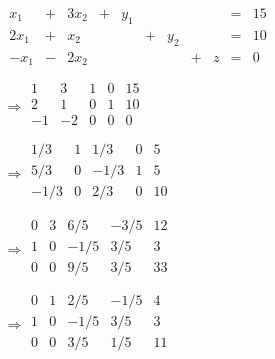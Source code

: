 \documentclass[dvipdfmx,titlepage, a4paper]{jsarticle}%
\begin{document}
\begin{eqnarray*}
	\begin{array}{ccccccccccc}
		x_{1} & + & 3x_{2} & + & y_{1} & \;& \; &\; & \; & = & 15\\
		2x_{1} & + & x_{2} & \; &\; & + & y_{2} &\; & \; & = & 10\\
		-x_{1} & - & 2x_{2} & \; &\; & \;& \; & + & z & = & 0\\
	\end{array}\\
	\Longrightarrow
	\begin{array}{ccccc}
		1 & 3 & 1 & 0 & 15\\
		2 & 1 & 0 & 1 & 10\\
		-1 & -2 & 0 & 0 & 0\\
	\end{array}\\
	\Longrightarrow
	\begin{array}{ccccc}
		1/3 & 1 & 1/3 & 0 & 5 \\
		5/3 & 0 & -1/3 & 1 & 5 \\
		-1/3 & 0 & 2/3 & 0 & 10 \\
	\end{array}\\
	\Longrightarrow
	\begin{array}{ccccc}
		0 & 3 & 6/5 & -3/5 & 12\\
		1 & 0 & -1/5 & 3/5 & 3\\
		0 & 0 & 9/5 & 3/5 & 33\\
	\end{array}\\
	\Longrightarrow
	\begin{array}{ccccc}
		0 & 1 & 2/5 & -1/5 & 4\\
		1 & 0 & -1/5 & 3/5 & 3\\
		0 & 0 & 3/5 & 1/5 & 11\\
	\end{array}\\
\end{eqnarray*}
\end{document}
